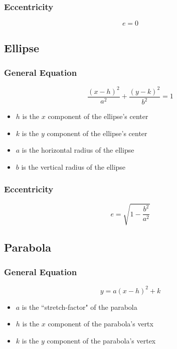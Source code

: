 \documentclass[12pt]{article}
\begin{document}
\subsubsection{Eccentricity}
\begin{equation*}
    e = 0
\end{equation*}

\subsection{Ellipse}
\subsubsection{General Equation}
\begin{equation*}
    \frac{(x - h)^2}{a^2} + \frac{(y - k)^2}{b^2} = 1
\end{equation*}
\begin{itemize}
    \item $h$ is the $x$ component of the ellipse's center
    \item $k$ is the $y$ component of the ellipse's center
    \item $a$ is the horizontal radius of the ellipse
    \item $b$ is the vertical radius of the ellipse
\end{itemize}

\subsubsection{Eccentricity}
\begin{equation*}
    e = \sqrt{1 - \frac{b^2}{a^2}}
\end{equation*}

\subsection{Parabola}
\subsubsection{General Equation}
\begin{equation*}
    y = a(x - h)^2 + k
\end{equation*}
\begin{itemize}
    \item $a$ is the ``stretch-factor" of the parabola
    \item $h$ is the $x$ component of the parabola's vertx
    \item $k$ is the $y$ component of the parabola's vertex
\end{itemize}
\end{document}
